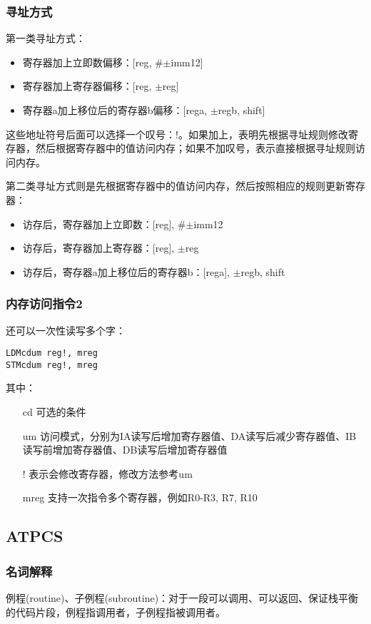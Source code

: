\subsubsection{寻址方式}
第一类寻址方式：
\begin{itemize}
\item 寄存器加上立即数偏移：[reg, \#$\pm$imm12]
\item 寄存器加上寄存器偏移：[reg, $\pm$reg]
\item 寄存器a加上移位后的寄存器b偏移：[rega, $\pm$regb, shift]
\end{itemize}
这些地址符号后面可以选择一个叹号：!。如果加上，表明先根据寻址规则修改寄存器，然后根据寄存器中的值访问内存；如果不加叹号，表示直接根据寻址规则访问内存。

第二类寻址方式则是先根据寄存器中的值访问内存，然后按照相应的规则更新寄存器：
\begin{itemize}
\item 访存后，寄存器加上立即数：[reg], \#$\pm$imm12
\item 访存后，寄存器加上寄存器：[reg], $\pm$reg
\item 访存后，寄存器a加上移位后的寄存器b：[rega], $\pm$regb, shift
\end{itemize}

\subsubsection{内存访问指令2}
还可以一次性读写多个字：
\begin{lstlisting}[numbers=none]
LDMcdum reg!, mreg
STMcdum reg!, mreg
\end{lstlisting}
其中：
\begin{itemize}
\item[cd] 可选的条件
\item[um] 访问模式，分别为IA读写后增加寄存器值、DA读写后减少寄存器值、IB读写前增加寄存器值、DB读写后增加寄存器值
\item[!] 表示会修改寄存器，修改方法参考um
\item[mreg] 支持一次指令多个寄存器，例如{R0-R3, R7, R10}
\end{itemize}

\subsection{ATPCS}
\subsubsection{名词解释}
例程(routine)、子例程(subroutine)：对于一段可以调用、可以返回、保证栈平衡的代码片段，例程指调用者，子例程指被调用者。

